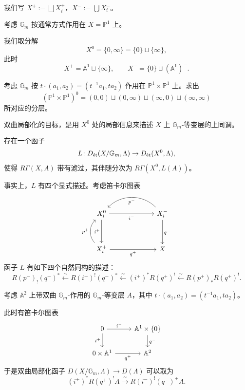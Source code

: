我们写 $X^+:=\bigsqcup X^+_i$，$X^-:=\bigcup X^-_i$。

\begin{example}
考虑 $\mathbb{G}_m$ 按通常方式作用在 $X=\mathbb{P}^1$ 上。
\begin{center}
\end{center}
\begin{center}
\end{center}

我们取分解
\[
X^0=\{0,\infty\}=\{0\}\sqcup\{\infty\},
\]
此时
\[
X^+=\mathbb{A}^1\sqcup\{\infty\},\qquad X^-=\{0\}\sqcup(\mathbb{A}^1)^-.
\]
\end{example}

\begin{exercise}
考虑 $\mathbb{G}_m$ 按 $t\cdot(a_1,a_2)=(t^{-1}a_1,ta_2)$ 作用在 $\mathbb{P}^1\times\mathbb{P}^1$ 上。求出
\[
(\mathbb{P}^1\times\mathbb{P}^1)^0=(0,0)\sqcup(0,\infty)\sqcup(\infty,0)\sqcup(\infty,\infty)
\]
所对应的分层。
\end{exercise}

双曲局部化的目标，是用 $X^0$ 处的局部信息来描述 $X$ 上 $\mathbb{G}_m$-等变层的上同调。


\begin{theorem}[Braden]
存在一个函子
\[
L\colon D_\et(X/\mathbb{G}_m,\Lambda)\to D_\et(X^0,\Lambda),
\]
使得 $R\Gamma(X,A)$ 带有滤过，其伴随分次为 $R\Gamma(X^0,L(A))$。

事实上，$L$ 有四个显式描述。考虑笛卡尔图表
\[
\begin{tikzcd}[column sep=6.5em, row sep=3.4em]
X^0_i \arrow[r, "i^-"'] \arrow[d, "i^+"'] & X^-_i \arrow[l, "p^-", bend right=45] \arrow[d, "q^-"] \\
X^+_i \arrow[u, "p^+", bend left=45] \arrow[r, "q^+"'] & X
\end{tikzcd}
\]
函子 $L$ 有如下四个自然同构的描述：
\[
R(p^-)_!(q^-)^*\xleftarrow{\ \sim\ }R(i^-)^!(q^-)^*\xleftarrow{\ \sim\ }(i^+)^*R(q^+)^!\xleftarrow{\ \sim\ }R(p^+)_*R(q^+)^!.
\]
\end{theorem}

\begin{example}
考虑 $\mathbb{A}^2$ 上带双曲 $\mathbb{G}_m$-作用的 $\mathbb{G}_m$-等变层 $A$，其中 $t\cdot(a_1,a_2)=(t^{-1}a_1,ta_2)$。
\begin{center}
\end{center}

此时有笛卡尔图表
\[
\begin{tikzcd}
0 \arrow[r, "i^-"] \arrow[d, "i^+"'] & \mathbb{A}^1\times\{0\} \arrow[d, "q^-"] \\
0\times\mathbb{A}^1 \arrow[r, "q^+"'] & \mathbb{A}^2
\end{tikzcd}
\]
于是双曲局部化函子 $D(X/\mathbb{G}_m,\Lambda)\to D(\Lambda)$ 可以取为
\[
(i^+)^*R(q^+)^!A\xrightarrow{\ \sim\ }R(i^-)^!(q^-)^+A.
\]
\end{example}

